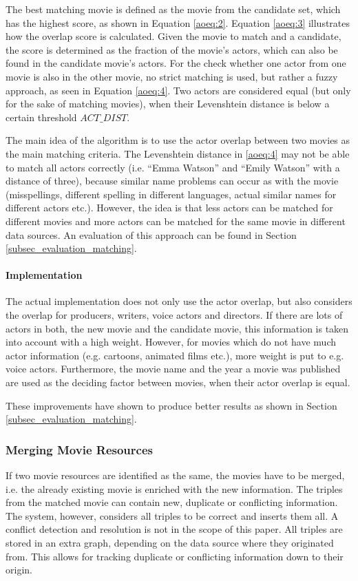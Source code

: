 The best matching movie is defined as the movie from the candidate set, which has the highest score, as shown in Equation \ref{aoeq:2}.
Equation \ref{aoeq:3} illustrates how the overlap score is calculated. Given the movie to match and a candidate, the score is determined as the fraction of the movie's actors, which can also be found in the candidate movie's actors.
For the check whether one actor from one movie is also in the other movie, no strict matching is used, but rather a fuzzy approach, as seen in Equation \ref{aoeq:4}.
Two actors are considered equal (but only for the sake of matching movies), when their Levenshtein distance is below a certain threshold $ACT\_DIST$.

The main idea of the algorithm is to use the actor overlap between two movies as the main matching criteria.
The Levenshtein distance in \ref{aoeq:4} may not be able to match all actors correctly (i.e. ``Emma Watson'' and ``Emily Watson'' with a distance of three), because similar name problems can occur as with the movie (misspellings, different spelling in different languages, actual similar names for different actors etc.).
However, the idea is that less actors can be matched for different movies and more actors can be matched for the same movie in different data sources.
An evaluation of this approach can be found in Section \ref{subsec_evaluation_matching}.

\paragraph{Implementation}
The actual implementation does not only use the actor overlap, but also considers the overlap for producers, writers, voice actors and directors.
If there are lots of actors in both, the new movie and the candidate movie, this information is taken into account with a high weight.
However, for movies which do not have much actor information (e.g. cartoons, animated films etc.), more weight is put to e.g. voice actors.
Furthermore, the movie name and the year a movie was published are used as the deciding factor between movies, when their actor overlap is equal.

These improvements have shown to produce better results as shown in Section \ref{subsec_evaluation_matching}.

\subsubsection{Merging Movie Resources}

If two movie resources are identified as the same, the movies have to be merged, i.e. the already existing movie is enriched with the new information.
The triples from the matched movie can contain new, duplicate or conflicting information.
The system, however, considers all triples to be correct and inserts them all.
A conflict detection and resolution is not in the scope of this paper.
All triples are stored in an extra graph, depending on the data source where they originated from.
This allows for tracking duplicate or conflicting information down to their origin.
